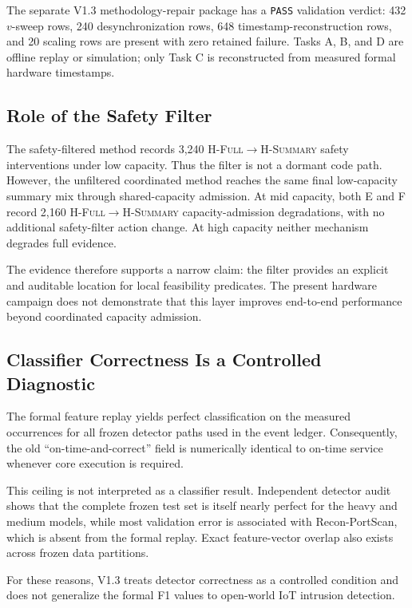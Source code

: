 \documentclass[10pt,journal]{IEEEtran}
\newcommand{\Hsummary}{\textsc{H-Summary}}
\newcommand{\Hfull}{\textsc{H-Full}}
\begin{document}
The separate V1.3 methodology-repair package has a \texttt{PASS}
validation verdict: 432 $v$-sweep rows, 240 desynchronization rows,
648 timestamp-reconstruction rows, and 20 scaling rows are present with
zero retained failure. Tasks A, B, and D are offline replay or simulation;
only Task C is reconstructed from measured formal hardware timestamps.

\subsection{Role of the Safety Filter}

The safety-filtered method records 3,240
\Hfull$\rightarrow$\Hsummary{} safety interventions under low capacity.
Thus the filter is not a dormant code path. However, the unfiltered
coordinated method reaches the same final low-capacity summary mix
through shared-capacity admission. At mid capacity, both E and F record
2,160 \Hfull$\rightarrow$\Hsummary{} capacity-admission degradations,
with no additional safety-filter action change. At high capacity neither
mechanism degrades full evidence.

The evidence therefore supports a narrow claim: the filter provides an
explicit and auditable location for local feasibility predicates.
The present hardware campaign does not demonstrate that this layer
improves end-to-end performance beyond coordinated capacity admission.

\subsection{Classifier Correctness Is a Controlled Diagnostic}

The formal feature replay yields perfect classification on the measured
occurrences for all frozen detector paths used in the event ledger.
Consequently, the old ``on-time-and-correct'' field is numerically
identical to on-time service whenever core execution is required.

This ceiling is not interpreted as a classifier result. Independent
detector audit shows that the complete frozen test set is itself nearly
perfect for the heavy and medium models, while most validation error is
associated with Recon-PortScan, which is absent from the formal replay.
Exact feature-vector overlap also exists across frozen data partitions.

For these reasons, V1.3 treats detector correctness as a controlled
condition and does not generalize the formal F1 values to open-world IoT
intrusion detection.
\end{document}
